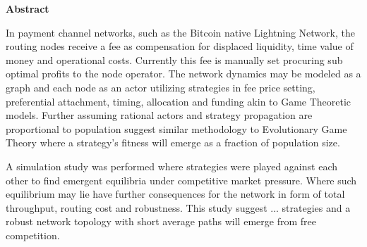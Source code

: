 \begin{center}
	\textbf{Abstract}
\end{center} 

In payment channel networks, such as the Bitcoin native Lightning Network, the routing nodes receive a fee as compensation for displaced liquidity, time value of money and operational costs. Currently this fee is manually set procuring sub optimal profits to the node operator. The network dynamics may be modeled as a graph and each node as an actor utilizing strategies in fee price setting, preferential attachment, timing, allocation and funding akin to Game Theoretic models. Further assuming rational actors and strategy propagation are proportional to population suggest similar methodology to Evolutionary Game Theory where a strategy's fitness will emerge as a fraction of population size. 

A simulation study was performed where strategies were played against each other to find emergent equilibria under competitive market pressure. Where such equilibrium may lie have further consequences for the network in form of total throughput, routing cost and robustness. This study suggest ... strategies and a robust network topology with short average paths will emerge from free competition.

